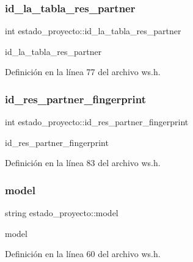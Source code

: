 \subsubsection{\texorpdfstring{id\+\_\+la\+\_\+tabla\+\_\+res\+\_\+partner}{id\_la\_tabla\_res\_partner}}
{\footnotesize\ttfamily int estado\+\_\+proyecto\+::id\+\_\+la\+\_\+tabla\+\_\+res\+\_\+partner}



id\+\_\+la\+\_\+tabla\+\_\+res\+\_\+partner 



Definición en la línea 77 del archivo ws.\+h.

\hypertarget{classestado__proyecto_afae9b5a359fb7c20ef16050a6cf0cbf7}{}\label{classestado__proyecto_afae9b5a359fb7c20ef16050a6cf0cbf7} 
\subsubsection{\texorpdfstring{id\+\_\+res\+\_\+partner\+\_\+fingerprint}{id\_res\_partner\_fingerprint}}
{\footnotesize\ttfamily int estado\+\_\+proyecto\+::id\+\_\+res\+\_\+partner\+\_\+fingerprint}



id\+\_\+res\+\_\+partner\+\_\+fingerprint 



Definición en la línea 83 del archivo ws.\+h.

\hypertarget{classestado__proyecto_af1c6ec6fe4c01a1faeab40a61e7e21d4}{}\label{classestado__proyecto_af1c6ec6fe4c01a1faeab40a61e7e21d4} 
\subsubsection{\texorpdfstring{model}{model}}
{\footnotesize\ttfamily string estado\+\_\+proyecto\+::model}



model 



Definición en la línea 60 del archivo ws.\+h.

\hypertarget{classestado__proyecto_a4dfe6545f55e5b6ac0077ad0f1d7e3c9}{}\label{classestado__proyecto_a4dfe6545f55e5b6ac0077ad0f1d7e3c9} 
